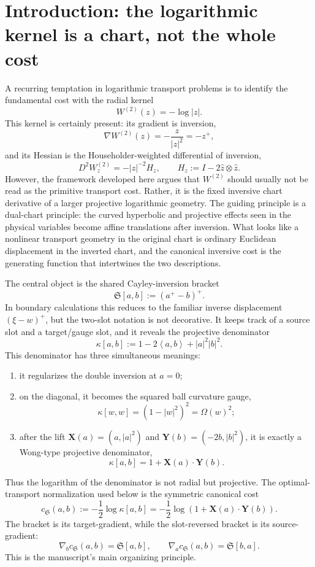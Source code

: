 \documentclass[11pt]{article}
\newcommand{\ip}[2]{\left\langle #1,#2\right\rangle}
\newcommand{\norm}[1]{\left|#1\right|}
\newcommand{\cs}{c_{\mathfrak S}}
\newcommand{\grad}{\nabla}
\newcommand{\Hh}{ H}
\newcommand{\Sbr}[2]{\mathfrak S[#1,#2]}
\newcommand{\kap}[2]{\kappa[#1,#2]}
\newcommand{\Om}{\Omega}
\newcommand{\Xlift}{\mathbf X}
\newcommand{\Ylift}{\mathbf Y}
\begin{document}
\tableofcontents

\section{Introduction: the logarithmic kernel is a chart, not the whole cost}

A recurring temptation in logarithmic transport problems is to identify the fundamental cost with the radial kernel
\[
    W^{(2)}(z)=-\log\norm z.
\]
This kernel is certainly present: its gradient is inversion,
\[
    \grad W^{(2)}(z)=-\frac{z}{\norm z^2}=-z^+,
\]
and its Hessian is the Householder-weighted differential of inversion,
\[
    D^2W^{(2)}_z=-\norm z^{-2}\Hh_z,
    \qquad
    \Hh_z:=I-2\hat z\otimes \hat z.
\]
However, the framework developed here argues that $W^{(2)}$ should usually not be read as the primitive transport cost.  Rather, it is the fixed inversive chart derivative of a larger projective logarithmic geometry.  The guiding principle is a dual-chart principle: the curved hyperbolic and projective effects seen in the physical variables become affine translations after inversion.  What looks like a nonlinear transport geometry in the original chart is ordinary Euclidean displacement in the inverted chart, and the canonical inversive cost is the generating function that intertwines the two descriptions.

The central object is the shared Cayley-inversion bracket
\[
    \Sbr{a}{b}:=(a^+-b)^+.
\]
In boundary calculations this reduces to the familiar inverse displacement $(\xi-w)^+$, but the two-slot notation is not decorative.  It keeps track of a source slot and a target/gauge slot, and it reveals the projective denominator
\[
    \kap{a}{b}:=1-2\ip a b+\norm a^2\norm b^2.
\]
This denominator has three simultaneous meanings:
\begin{enumerate}[label=(\roman*)]
    \item it regularizes the double inversion at $a=0$;
    \item on the diagonal, it becomes the squared ball curvature gauge,
    \[
        \kap{w}{w}=(1-\norm w^2)^2=\Om(w)^2;
    \]
    \item after the lift $\Xlift(a)=(a,\norm a^2)$ and $\Ylift(b)=(-2b,\norm b^2)$, it is exactly a Wong-type projective denominator,
    \[
        \kap{a}{b}=1+\Xlift(a)\cdot \Ylift(b).
    \]
\end{enumerate}
Thus the logarithm of the denominator is not radial but projective.  The optimal-transport normalization used below is the symmetric canonical cost
\[
    \cs(a,b):=-\frac12\log\kap{a}{b}
    =-\frac12\log(1+\Xlift(a)\cdot \Ylift(b)).
\]
The bracket is its target-gradient, while the slot-reversed bracket is its source-gradient:
\[
    \grad_b\cs(a,b)=\Sbr{a}{b},
    \qquad
    \grad_a\cs(a,b)=\Sbr{b}{a}.
\]
This is the manuscript's main organizing principle.
\end{document}

